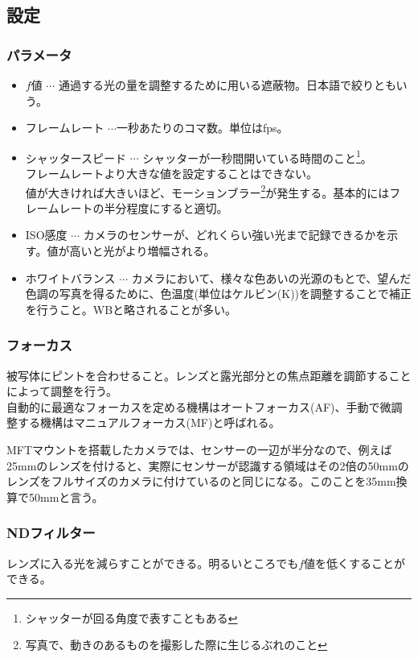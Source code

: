 \documentclass[a4paper]{ltjsreport}
\begin{document}
\subsection{設定}
\subsubsection{パラメータ}
\begin{itemize}
  \item $f値$ $\cdots$ 通過する光の量を調整するために用いる遮蔽物。日本語で絞りともいう。
  \item フレームレート $\cdots$一秒あたりのコマ数。単位はfps。
  \item シャッタースピード $\cdots$ シャッターが一秒間開いている時間のこと\footnote{シャッターが回る角度で表すこともある}。\\フレームレートより大きな値を設定することはできない。 \\値が大きければ大きいほど、モーションブラー\footnote{写真で、動きのあるものを撮影した際に生じるぶれのこと}が発生する。基本的にはフレームレートの半分程度にすると適切。
  \item ISO感度 $\cdots$ カメラのセンサーが、どれくらい強い光まで記録できるかを示す。値が高いと光がより増幅される。
  \item ホワイトバランス $\cdots$ カメラにおいて、様々な色あいの光源のもとで、望んだ色調の写真を得るために、色温度(単位はケルビン(K))を調整することで補正を行うこと。WBと略されることが多い。
\end{itemize}
\subsubsection{フォーカス}
被写体にピントを合わせること。レンズと露光部分との焦点距離を調節することによって調整を行う。\\自動的に最適なフォーカスを定める機構はオートフォーカス(AF)、手動で微調整する機構はマニュアルフォーカス(MF)と呼ばれる。
\begin{boxnote}
  MFTマウントを搭載したカメラでは、センサーの一辺が半分なので、例えば25mmのレンズを付けると、実際にセンサーが認識する領域はその2倍の50mmのレンズをフルサイズのカメラに付けているのと同じになる。このことを35mm換算で50mmと言う。
\end{boxnote}
\subsubsection{NDフィルター}
レンズに入る光を減らすことができる。明るいところでも$f値$を低くすることができる。
\end{document}
